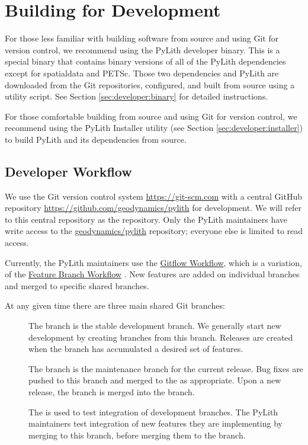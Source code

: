 \section{Building for Development}
\label{sec:developer:build}

For those less familiar with building software from source and using
Git for version control, we recommend using the PyLith developer
binary. This is a special binary that contains binary versions of all of the PyLith
dependencies except for spatialdata and PETSc. Those two dependencies
and PyLith are downloaded from the Git repositories, configured, and
built from source using a utility script. See Section
\vref{sec:developer:binary} for detailed instructions.

For those comfortable building from source and using Git for version
control, we recommend using the PyLith Installer utility (see Section
\vref{sec:developer:installer}) to build PyLith and its dependencies from
source.

\subsection{Developer Workflow}

We use the Git version control system \url{https://git-scm.com} with a
central GitHub repository \url{https://github.com/geodynamics/pylith}
for development. We will refer to this central repository as the
 repository. Only the PyLith maintainers
have write access to the \url{geodynamics/pylith} repository; everyone
else is limited to read access.

Currently, the PyLith maintainers use the
\href{https://www.atlassian.com/git/tutorials/comparing-workflows/gitflow-workflow}{Gitflow
  Workflow}, which is a variation, of the
\href{https://www.atlassian.com/git/tutorials/comparing-workflows/feature-branch-workflow}{Feature
  Branch Workflow} . New features are added on individual branches and
merged to specific shared branches.

At any given time there are three main shared Git branches:
\begin{description}
\item[] The  branch is the
  stable development branch. We generally start new development by
  creating branches from this branch. Releases are created when the
   branch has accumulated a desired set of features.
\item[] The  branch is the
  maintenance branch for the current release. Bug fixes are pushed
  to this branch and merged to the  as
  appropriate. Upon a new release, the  branch is
  merged into the  branch.
\item[] The  is used to test
  integration of development branches. The PyLith maintainers test
  integration of new features they are implementing by merging to
  this branch, before merging them to the 
  branch.
\end{description}

